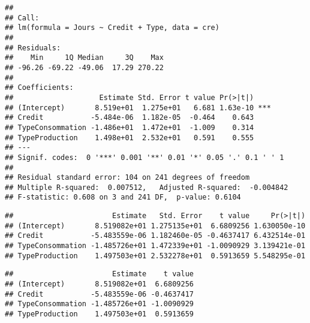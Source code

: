 \documentclass[
]{article}
\newenvironment{Shaded}{\begin{snugshade}}{\end{snugshade}}
\newcommand{\CommentTok}[1]{\textcolor[rgb]{0.56,0.35,0.01}{\textit{#1}}}
\newcommand{\DecValTok}[1]{\textcolor[rgb]{0.00,0.00,0.81}{#1}}
\newcommand{\FunctionTok}[1]{\textcolor[rgb]{0.00,0.00,0.00}{#1}}
\newcommand{\NormalTok}[1]{#1}
\newcommand{\SpecialCharTok}[1]{\textcolor[rgb]{0.00,0.00,0.00}{#1}}
\begin{document}
\begin{verbatim}
## 
## Call:
## lm(formula = Jours ~ Credit + Type, data = cre)
## 
## Residuals:
##    Min     1Q Median     3Q    Max 
## -96.26 -69.22 -49.06  17.29 270.22 
## 
## Coefficients:
##                    Estimate Std. Error t value Pr(>|t|)    
## (Intercept)       8.519e+01  1.275e+01   6.681 1.63e-10 ***
## Credit           -5.484e-06  1.182e-05  -0.464    0.643    
## TypeConsommation -1.486e+01  1.472e+01  -1.009    0.314    
## TypeProduction    1.498e+01  2.532e+01   0.591    0.555    
## ---
## Signif. codes:  0 '***' 0.001 '**' 0.01 '*' 0.05 '.' 0.1 ' ' 1
## 
## Residual standard error: 104 on 241 degrees of freedom
## Multiple R-squared:  0.007512,   Adjusted R-squared:  -0.004842 
## F-statistic: 0.608 on 3 and 241 DF,  p-value: 0.6104
\end{verbatim}

\begin{Shaded}
\end{Shaded}

\begin{verbatim}
##                       Estimate   Std. Error    t value     Pr(>|t|)
## (Intercept)       8.519082e+01 1.275135e+01  6.6809256 1.630050e-10
## Credit           -5.483559e-06 1.182460e-05 -0.4637417 6.432514e-01
## TypeConsommation -1.485726e+01 1.472339e+01 -1.0090929 3.139421e-01
## TypeProduction    1.497503e+01 2.532278e+01  0.5913659 5.548295e-01
\end{verbatim}

\begin{Shaded}
\end{Shaded}

\begin{verbatim}
##                       Estimate    t value
## (Intercept)       8.519082e+01  6.6809256
## Credit           -5.483559e-06 -0.4637417
## TypeConsommation -1.485726e+01 -1.0090929
## TypeProduction    1.497503e+01  0.5913659
\end{verbatim}
\end{document}
